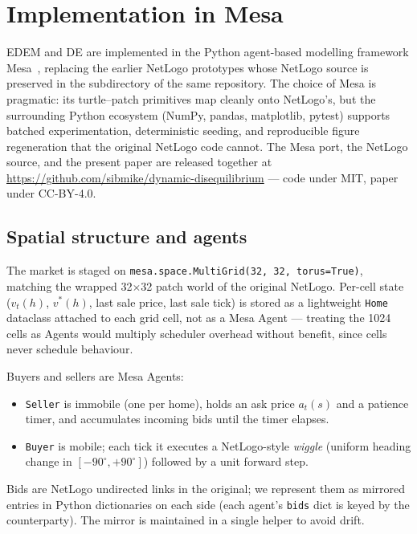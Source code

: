 \section{Implementation in Mesa}
\label{sec:implementation}

EDEM and DE are implemented in the Python agent-based modelling
framework Mesa~\citep{masad2015mesa}, replacing the earlier NetLogo
prototypes whose NetLogo source is preserved in the
 subdirectory of the same repository. The
choice of Mesa is pragmatic: its turtle--patch primitives map cleanly
onto NetLogo's, but the surrounding Python ecosystem (NumPy, pandas,
matplotlib, pytest) supports batched experimentation, deterministic
seeding, and reproducible figure regeneration that the original
NetLogo code cannot. The Mesa port, the NetLogo source, and the
present paper are released together at
\url{https://github.com/sibmike/dynamic-disequilibrium} --- code under MIT,
paper under CC-BY-4.0.

\subsection{Spatial structure and agents}
\label{sec:implementation-space}

The market is staged on \texttt{mesa.space.MultiGrid(32, 32, torus=True)},
matching the wrapped 32$\times$32 patch world of the original
NetLogo. Per-cell state ($v_{t}(h)$, $v^{*}(h)$, last sale price,
last sale tick) is stored as a lightweight \texttt{Home} dataclass
attached to each grid cell, not as a Mesa Agent --- treating the 1024
cells as Agents would multiply scheduler overhead without benefit,
since cells never schedule behaviour.

Buyers and sellers are Mesa Agents:
\begin{itemize}[leftmargin=*,nosep]
\item \texttt{Seller} is immobile (one per home), holds an ask price
      $a_{t}(s)$ and a patience timer, and accumulates incoming bids
      until the timer elapses.
\item \texttt{Buyer} is mobile; each tick it executes a NetLogo-style
      \emph{wiggle} (uniform heading change in $[-90^{\circ}, +90^{\circ}]$)
      followed by a unit forward step.
\end{itemize}
Bids are NetLogo undirected links in the original; we represent them
as mirrored entries in Python dictionaries on each side (each agent's
\texttt{bids} dict is keyed by the counterparty). The mirror is
maintained in a single helper to avoid drift.


